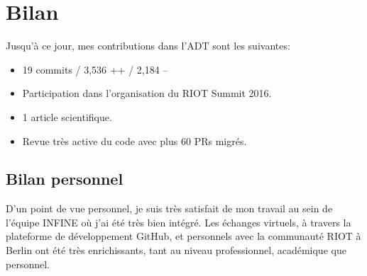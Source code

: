 \documentclass[a4paper, twoside]{article}
\newenvironment{notes}[0]{\color{blue}}{\color{black}}
\begin{document}





\section{Bilan}
Jusqu'à ce jour, mes contributions dans l'ADT sont les suivantes:

\begin{itemize}
	\item 19 commits / 3,536 ++ / 2,184 --
	\item Participation dans l'organisation du RIOT Summit 2016.
	\item 1 article scientifique.
	\item Revue très active du code avec plus 60 PRs migrés.
\end{itemize}

\subsection*{Bilan personnel}
D'un point de vue personnel, je suis très satisfait de mon travail au sein de
l'équipe INFINE où j'ai été très bien intégré. Les échanges virtuels, à travers
la plateforme de développement GitHub, et personnels avec la communauté RIOT à
Berlin ont été très enrichissants, tant au niveau professionnel, académique que
personnel.
\end{document}
